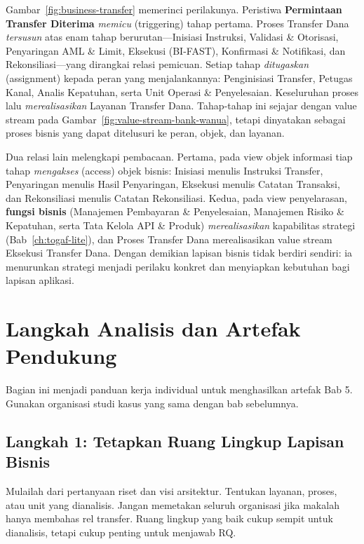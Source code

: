 Gambar~\ref{fig:business-transfer} memerinci perilakunya. Peristiwa
\textbf{Permintaan Transfer Diterima} \emph{memicu} (triggering) tahap pertama.
Proses Transfer Dana \emph{tersusun} atas enam tahap berurutan---Inisiasi
Instruksi, Validasi \& Otorisasi, Penyaringan AML \& Limit, Eksekusi (BI-FAST),
Konfirmasi \& Notifikasi, dan Rekonsiliasi---yang dirangkai relasi pemicuan.
Setiap tahap \emph{ditugaskan} (assignment) kepada peran yang menjalankannya:
Penginisiasi Transfer, Petugas Kanal, Analis Kepatuhan, serta Unit Operasi \&
Penyelesaian. Keseluruhan proses lalu \emph{merealisasikan} Layanan Transfer
Dana. Tahap-tahap ini sejajar dengan value stream pada
Gambar~\ref{fig:value-stream-bank-wanua}, tetapi dinyatakan sebagai proses bisnis
yang dapat ditelusuri ke peran, objek, dan layanan.

Dua relasi lain melengkapi pembacaan. Pertama, pada view objek informasi tiap
tahap \emph{mengakses} (access) objek bisnis: Inisiasi menulis Instruksi
Transfer, Penyaringan menulis Hasil Penyaringan, Eksekusi menulis Catatan
Transaksi, dan Rekonsiliasi menulis Catatan Rekonsiliasi. Kedua, pada view
penyelarasan, \textbf{fungsi bisnis} (Manajemen Pembayaran \& Penyelesaian,
Manajemen Risiko \& Kepatuhan, serta Tata Kelola API \& Produk)
\emph{merealisasikan} kapabilitas strategi (Bab~\ref{ch:togaf-lite}), dan Proses
Transfer Dana merealisasikan value stream Eksekusi Transfer Dana. Dengan
demikian lapisan bisnis tidak berdiri sendiri: ia menurunkan strategi menjadi
perilaku konkret dan menyiapkan kebutuhan bagi lapisan aplikasi.

\section{Langkah Analisis dan Artefak Pendukung}

Bagian ini menjadi panduan kerja individual untuk menghasilkan artefak Bab 5.
Gunakan organisasi studi kasus yang sama dengan bab sebelumnya.

\subsection{Langkah 1: Tetapkan Ruang Lingkup Lapisan Bisnis}

Mulailah dari pertanyaan riset dan visi arsitektur. Tentukan layanan, proses,
atau unit yang dianalisis. Jangan memetakan seluruh organisasi jika makalah
hanya membahas rel transfer. Ruang lingkup yang baik cukup sempit untuk
dianalisis, tetapi cukup penting untuk menjawab RQ.

